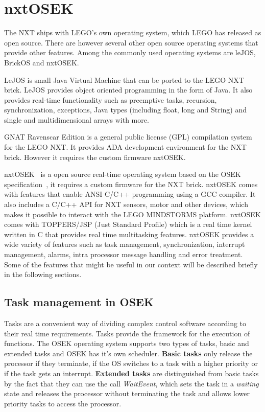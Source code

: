 \section{nxtOSEK}
The NXT ships with LEGO's own operating system, which LEGO has released as open source. There are however several other open source operating systems that provide other features. 
Among the commonly used operating systems are leJOS, BrickOS and nxtOSEK.

LeJOS is small Java Virtual Machine that can be ported to the LEGO NXT brick\cite{lejos}. LeJOS provides object oriented programming in the form of Java. It also provides real-time functionality such as preemptive tasks, recursion, synchronization, exceptions, Java types (including float, long and String) and single and multidimensional arrays with more. 

GNAT Ravenscar Edition is a general public license (GPL) compilation system for the LEGO NXT. It provides ADA development environment for the NXT brick. However it requires the custom firmware nxtOSEK\cite{ada}.

nxtOSEK~\cite{osek_os} is a open source real-time operating system based on the OSEK specification~\cite{osek_spec}, it requires a custom firmware for the NXT brick.
nxtOSEK comes with features that enable ANSI C/C++ programming using a GCC compiler. It also includes a C/C++ API for NXT sensors, motor and other devices, which makes it possible to interact with the LEGO MINDSTORMS platform. nxtOSEK comes with TOPPERS/JSP (Just Standard Profile) which is a real time kernel written in C that provides real time multitasking features.
nxtOSEK provides a wide variety of features such as task management, synchronization, interrupt management, alarms, intra processor message handling and error treatment. Some of the features that might be useful in our context will be described briefly in the following sections. 

\subsection{Task management in OSEK} %
\label{sub:task_management_in_osek}
Tasks are a convenient way of dividing complex control software according to their real time requirements. Tasks provide the framework for the execution of functions. 
The OSEK operating system supports two types of tasks, basic and extended tasks and OSEK has it's own scheduler.
\textbf{Basic tasks} only release the processor if they terminate, if the OS switches to a task with a higher priority or if the task gets an interrupt.
\textbf{Extended tasks} are distinguished from basic tasks by the fact that they can use the call \emph{WaitEvent}, which sets the task in a \emph{waiting} state and releases the processor without terminating the task and allows lower priority tasks to access the processor.


